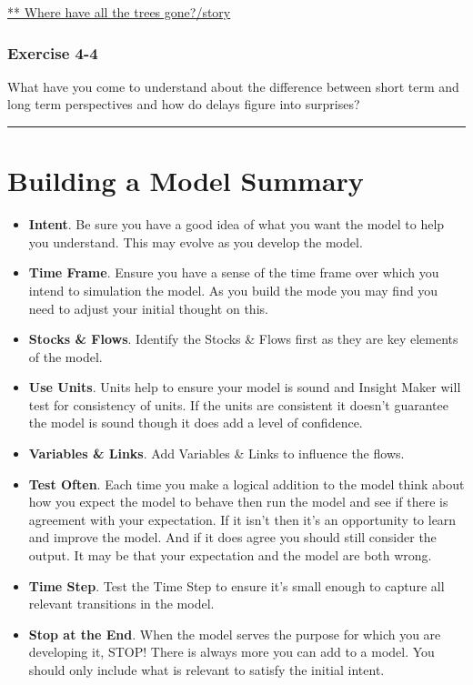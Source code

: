 \documentclass[]{memoir}
\begin{document}
\href{http://insightmaker.com/insight/8238}{** Where have all the trees
gone?/story}

\subsubsection{Exercise 4-4}

What have you come to understand about the difference between short term
and long term perspectives and how do delays figure into surprises?

\begin{center}\rule{3in}{0.4pt}\end{center}

\section{Building a Model Summary}

\begin{itemize}
\itemsep1pt\parskip0pt
\item
  \textbf{Intent}. Be sure you have a good idea of what you want the
  model to help you understand. This may evolve as you develop the
  model.
\item
  \textbf{Time Frame}. Ensure you have a sense of the time frame over
  which you intend to simulation the model. As you build the mode you
  may find you need to adjust your initial thought on this.
\item
  \textbf{Stocks \& Flows}. Identify the Stocks \& Flows first as they
  are key elements of the model.
\item
  \textbf{Use Units}. Units help to ensure your model is sound and
  Insight Maker will test for consistency of units. If the units are
  consistent it doesn't guarantee the model is sound though it does add
  a level of confidence.
\item
  \textbf{Variables \& Links}. Add Variables \& Links to influence the
  flows.
\item
  \textbf{Test Often}. Each time you make a logical addition to the
  model think about how you expect the model to behave then run the
  model and see if there is agreement with your expectation. If it isn't
  then it's an opportunity to learn and improve the model. And if it
  does agree you should still consider the output. It may be that your
  expectation and the model are both wrong.
\item
  \textbf{Time Step}. Test the Time Step to ensure it's small enough to
  capture all relevant transitions in the model.
\item
  \textbf{Stop at the End}. When the model serves the purpose for which
  you are developing it, STOP! There is always more you can add to a
  model. You should only include what is relevant to satisfy the initial
  intent.
\end{itemize}
\end{document}
